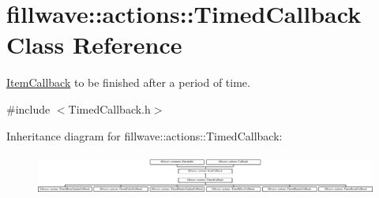 \hypertarget{classfillwave_1_1actions_1_1TimedCallback}{}\section{fillwave\+:\+:actions\+:\+:Timed\+Callback Class Reference}
\label{classfillwave_1_1actions_1_1TimedCallback}


\hyperlink{classfillwave_1_1actions_1_1ItemCallback}{Item\+Callback} to be finished after a period of time.  




{\ttfamily \#include $<$Timed\+Callback.\+h$>$}

Inheritance diagram for fillwave\+:\+:actions\+:\+:Timed\+Callback\+:\begin{figure}[H]
\begin{center}
\leavevmode
\includegraphics[height=1.377614cm]{classfillwave_1_1actions_1_1TimedCallback}
\end{center}
\end{figure}

